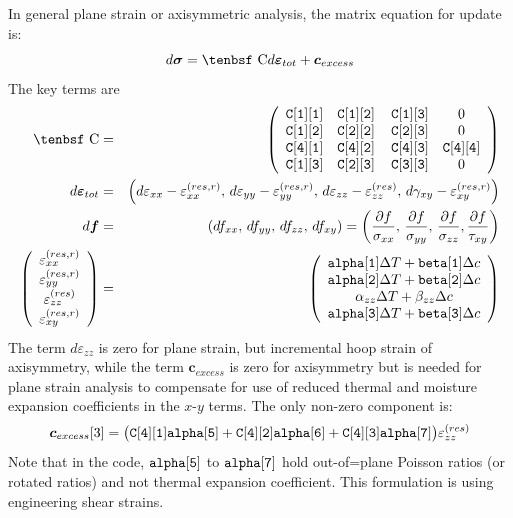 \documentclass[11pt]{book}
\renewcommand{\vec}[1]{\boldsymbol{#1}}
\def\a#1{\alpha_{#1}}
\def\b#1{\beta_{#1}}
\def\C{\hbox{\tenbsf C}}
\def\cex{\vec{c}_{excess}}
\def\code#1{{\small\tt #1}}
\def\deff{d \vec{\varepsilon}_{tot}}
\def\df{d \vec{f}}
\def\dsig{d \vec{\sigma}}
\def\DT{\Delta T}
\def\e#1{\varepsilon_{#1}}
\def\er#1{\varepsilon_{#1}^{(res)}}
\def\err#1{\varepsilon_{#1}^{(res,r)}}
\def\g#1{\gamma_{#1}}
\begin{document}
In general plane strain or axisymmetric analysis, the matrix equation for update is:
\begin{equation}
    \dsig = \C \deff +\cex
\end{equation}
The key terms are
\begin{eqnarray}
      \C & = & \left(\begin{array}{cccc} \code{C[1][1]}  & \code{C[1][2]}  & \thinspace\code{C[1][3]}  & 0   \\
                    \code{C[1][2]}  & \code{C[2][2]}  & \thinspace\code{C[2][3]}  & 0 \\
                            \code{C[4][1]}  & \code{C[4][2]}  & \thinspace\code{C[4][3]}  & \code{C[4][4]}  \\
                 \code{C[1][3]}  & \code{C[2][3]}  & \thinspace\code{C[3][3]}  & 0 \end{array}\right)  \\
      \deff & = & \left(d\e{xx} - \err{xx}, \thinspace d\e{yy} - \err{yy}, \thinspace d\e{zz} -  \er{zz}, 
              \thinspace d\g{xy}-\err{xy}\right) \\
      \df & = & (df_{xx}, \thinspace df_{yy}, \thinspace df_{zz}, \thinspace df_{xy})
                  = \left({\partial f\over \sigma_{xx}}, \thinspace {\partial f\over \sigma_{yy}}, \thinspace {\partial f\over \sigma_{zz}},
                                {\partial f\over \tau_{xy}}\right)  \\
\left(\begin{array}{c} \err{xx} \\ \err{yy} \\ \er{zz} \\ \err{xy} \end{array}\right)
       & = &  \left(\begin{array}{c}
	\code{alpha[1]}\DT + \code{beta[1]}\Delta c \\
	\code{alpha[2]}\DT + \code{beta[2]}\Delta c \\
	\a{zz}\DT + \b{zz}\Delta c \\
	\code{alpha[3]}\DT + \code{beta[3]}\Delta c  \end{array}\right) 
 \end{eqnarray}
The term $d\e{zz}$ is zero for plane strain, but incremental hoop strain of axisymmetry, while the term $\cex$ is zero for axisymmetry but is needed for plane strain analysis to compensate for use of reduced thermal and moisture expansion coefficients in the $x$-$y$ terms. The only non-zero component is:
\begin{equation}
      \cex[3] = \bigl(\code{C[4][1]}\code{alpha[5]}
              + \code{C[4][2]}\code{alpha[6]}+\code{C[4][3]}\code{alpha[7]}\bigr)\er{zz} 
\end{equation}
Note that in the code, $\code{alpha[5]}$ to $\code{alpha[7]}$ hold out-of=plane Poisson ratios (or rotated ratios) and not thermal expansion coefficient.
This formulation is using engineering shear strains. 
 
\end{document}
